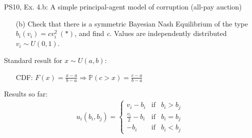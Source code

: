 \begin{frame}{PS10, Ex. 4.b: A simple principal-agent model of corruption (all-pay auction)}
    \begin{itemize}
      \item[(b)] Check that there is a symmetric Bayesian Nash Equilibrium of the type $b_i(v_i) = cv_i^2\ (*)$, and find \textit{c}. Values are independently distributed $v_i\sim U(0, 1)$.
    \end{itemize} \vspace{-8pt}
    \begin{multicols}{2}
      \vfill\null\columnbreak
      Standard result for $x\sim U(a, b):$ \vspace{-6pt}
      \begin{itemize}
        \item[CDF:] $F(x)=\frac{x-a}{b-a}\Rightarrow\mathbb{P}(c>x)=\frac{c-a}{b-a}$
      \end{itemize}
      \vspace{-6pt}
      Results so far: \vspace{-6pt}
      \begin{align*}
        u_i(b_i,b_j)=\left\{\begin{array}{lcl}
          v_i-b_i           & \text{if} & b_i>b_j \\
          \frac{v_i}{2}-b_i & \text{if} & b_i=b_j \\
          -b_i              & \text{if} & b_i<b_j
        \end{array}\right.
      \end{align*}
      \vfill\null
    \end{multicols}
\end{frame}
